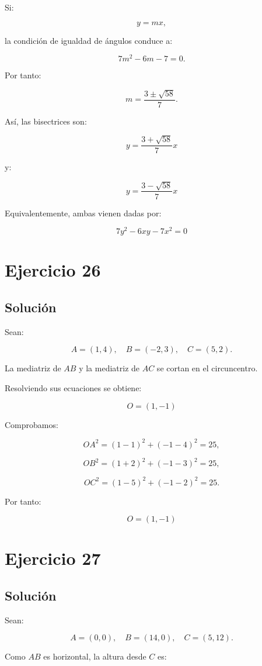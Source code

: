 \documentclass[11pt,a4paper]{article}
\begin{document}
Si:

\[
y=mx,
\]

la condición de igualdad de ángulos conduce a:

\[
7m^2-6m-7=0.
\]

Por tanto:

\[
m
=
\frac{3\pm\sqrt{58}}{7}.
\]

Así, las bisectrices son:

\[
\boxed{
y
=
\frac{3+\sqrt{58}}{7}x
}
\]

y:

\[
\boxed{
y
=
\frac{3-\sqrt{58}}{7}x
}
\]

Equivalentemente, ambas vienen dadas por:

\[
\boxed{
7y^2-6xy-7x^2=0
}
\]

\section{Ejercicio 26}
\subsection{Solución}

Sean:

\[
A=(1,4),
\quad
B=(-2,3),
\quad
C=(5,2).
\]

La mediatriz de \(AB\) y la mediatriz de \(AC\) se cortan en el circuncentro.

Resolviendo sus ecuaciones se obtiene:

\[
\boxed{
O=(1,-1)
}
\]

Comprobamos:

\[
OA^2
=
(1-1)^2+(-1-4)^2
=
25,
\]

\[
OB^2
=
(1+2)^2+(-1-3)^2
=
25,
\]

\[
OC^2
=
(1-5)^2+(-1-2)^2
=
25.
\]

Por tanto:

\[
\boxed{
O=(1,-1)
}
\]

\section{Ejercicio 27}
\subsection{Solución}

Sean:

\[
A=(0,0),
\quad
B=(14,0),
\quad
C=(5,12).
\]

Como \(AB\) es horizontal, la altura desde \(C\) es:
\end{document}

